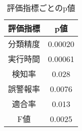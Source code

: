 \begin{table}[b]
  \centering
  \renewcommand{\arraystretch}{0.9}
  \caption{評価指標ごとのp値}
  \label{p}  %
  \begin{tabular}{|c|c|}  %
      \hline  %
      評価指標 & p値 \\
      \hline  %
      分類精度 & 0.00020\\
      \hline
      実行時間 &0.00061\\
      \hline  %
      検知率  & 0.028\\
      \hline  %
      誤警報率 &0.0076\\
      \hline 
      適合率 &0.013\\
      \hline
      F値 & 0.0025\\
      \hline
  \end{tabular}
\end{table}